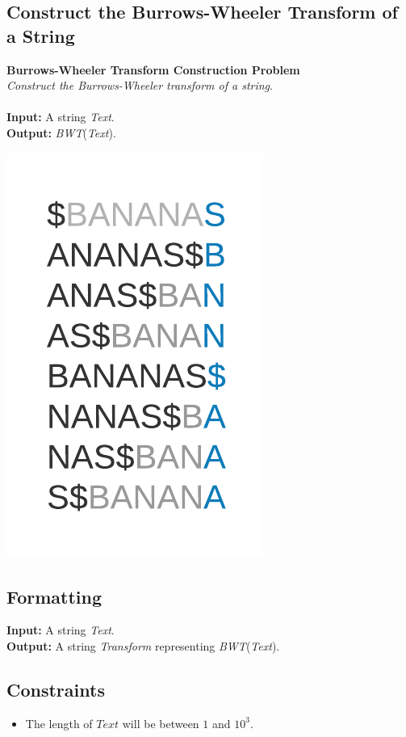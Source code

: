 \documentclass{article}
\begin{document}
\subsection{Construct the Burrows-Wheeler Transform of a String}
\hline\vspace{5}
\textbf{Burrows-Wheeler Transform Construction Problem}\\
\emph{Construct the Burrows-Wheeler transform of a string}.\\ \\
\textbf{Input:} A string \emph{Text}.\\
\textbf{Output:} \emph{BWT}(\emph{Text}).
\begin{center}
    \includegraphics[scale=0.2]{c9/logos/9I.png} 
\end{center}
\hline\vspace{5}

\subsection*{Formatting}
\textbf{Input:} A string \emph{Text}.\\
\noindent\textbf{Output:} A string \emph{Transform} representing \emph{BWT}(\emph{Text}).

\subsection*{Constraints}
\begin{itemize}
    \item The length of $Text$ will be between $1$ and $10^3$.
\end{itemize}
\pagebreak
\end{document}
